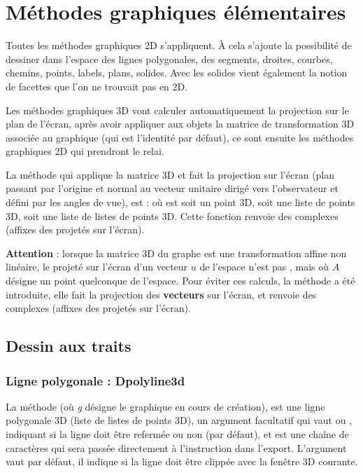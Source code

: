 \section{Méthodes graphiques élémentaires}

Toutes les méthodes graphiques 2D s'appliquent. À cela s'ajoute la possibilité de dessiner dans l'espace des lignes polygonales, des segments, droites, courbes, chemins, points, labels, plans, solides. Avec les solides vient également la notion de facettes que l'on ne trouvait pas en 2D.

Les méthodes graphiques 3D vont calculer automatiquement la projection sur le plan de l'écran, après avoir appliquer aux objets la matrice de transformation 3D associée au graphique (qui est l'identité par défaut), ce sont ensuite les méthodes graphiques 2D qui prendront le relai.

La méthode qui applique la matrice 3D et fait la projection sur l'écran (plan passant par l'origine et normal au vecteur unitaire dirigé vers l'observateur et défini par les angles de vue), est :  où  est soit un point 3D, soit une liste de points 3D, soit une liste de listes de points 3D. Cette fonction renvoie des complexes (affixes des projetés sur l'écran).

\textbf{Attention} : lorsque la matrice 3D du graphe est une transformation affine non linéaire, le projeté sur l'écran d'un vecteur $u$ de l'espace n'est pas , mais  où $A$ désigne un point quelconque de l'espace. Pour éviter ces calculs, la méthode  a été  introduite, elle fait la projection des \textbf{vecteurs} sur l'écran, et renvoie des complexes (affixes des projetés sur l'écran).

\subsection{Dessin aux traits}

\subsubsection{Ligne polygonale : Dpolyline3d}

La méthode  (où \emph{g} désigne le graphique en cours de création),  est une ligne polygonale 3D (liste de listes de points 3D),  un argument facultatif qui vaut \true ou \false, indiquant si la ligne doit être refermée ou non (\false par défaut), et  est une chaîne de caractères qui sera passée directement à l'instruction \drawcmd dans l'export. L'argument  vaut \false par défaut, il indique si la ligne  doit être clippée avec la fenêtre 3D courante.
    

